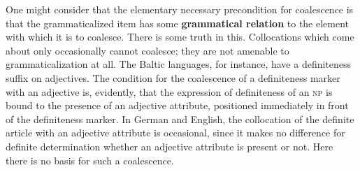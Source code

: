 One might consider that the elementary necessary precondition for coalescence is that the grammaticalized item has some \textbf{grammatical relation} to the element with which it is to coalesce. There is some truth in this. Collocations which come about only occasionally cannot coalesce; they are not amenable to grammaticalization at all. The Baltic languages, for instance, have a definiteness suffix on adjectives. The condition for the coalescence of a definiteness marker with an adjective is, evidently, that the expression of definiteness of an \textsc{np} is bound to the presence of an adjective attribute, positioned immediately in front of the definiteness marker. In German and English, the collocation of the definite article with an adjective attribute is occasional, since it makes no difference for definite determination whether an adjective attribute is present or not. Here there is no basis for such a coalescence.

